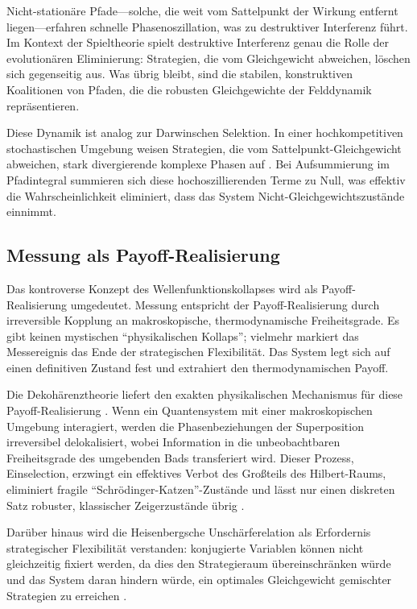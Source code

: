 \documentclass[12pt,a4paper]{article}
\theoremstyle{remark}
\begin{document}
Nicht-station\"are Pfade---solche, die weit vom Sattelpunkt der Wirkung entfernt liegen---erfahren schnelle Phasenoszillation, was zu destruktiver Interferenz f\"uhrt. Im Kontext der Spieltheorie spielt destruktive Interferenz genau die Rolle der evolution\"aren Eliminierung: Strategien, die vom Gleichgewicht abweichen, l\"oschen sich gegenseitig aus. Was \"ubrig bleibt, sind die stabilen, konstruktiven Koalitionen von Pfaden, die die robusten Gleichgewichte der Felddynamik repr\"asentieren.

Diese Dynamik ist analog zur Darwinschen Selektion. In einer hochkompetitiven stochastischen Umgebung weisen Strategien, die vom Sattelpunkt-Gleichgewicht abweichen, stark divergierende komplexe Phasen auf \citep{QuantumStrategies2024}. Bei Aufsummierung im Pfadintegral summieren sich diese hochoszillierenden Terme zu Null, was effektiv die Wahrscheinlichkeit eliminiert, dass das System Nicht-Gleichgewichtszust\"ande einnimmt.

\subsection{Messung als Payoff-Realisierung}

Das kontroverse Konzept des Wellenfunktionskollapses wird als Payoff-Realisierung umgedeutet. Messung entspricht der Payoff-Realisierung durch irreversible Kopplung an makroskopische, thermodynamische Freiheitsgrade. Es gibt keinen mystischen ``physikalischen Kollaps''; vielmehr markiert das Messereignis das Ende der strategischen Flexibilit\"at. Das System legt sich auf einen definitiven Zustand fest und extrahiert den thermodynamischen Payoff.

Die Dekoh\"arenztheorie liefert den exakten physikalischen Mechanismus f\"ur diese Payoff-Realisierung \citep{MeasurementClassical}. Wenn ein Quantensystem mit einer makroskopischen Umgebung interagiert, werden die Phasenbeziehungen der Superposition irreversibel delokalisiert, wobei Information in die unbeobachtbaren Freiheitsgrade des umgebenden Bads transferiert wird. Dieser Prozess, Einselection, erzwingt ein effektives Verbot des Gro\ss{}teils des Hilbert-Raums, eliminiert fragile ``Schr\"odinger-Katzen''-Zust\"ande und l\"asst nur einen diskreten Satz robuster, klassischer Zeigerzust\"ande \"ubrig \citep{Zurek2003}.

Dar\"uber hinaus wird die Heisenbergsche Unsch\"arferelation als Erfordernis strategischer Flexibilit\"at verstanden: konjugierte Variablen k\"onnen nicht gleichzeitig fixiert werden, da dies den Strategieraum \"ubereinschr\"anken w\"urde und das System daran hindern w\"urde, ein optimales Gleichgewicht gemischter Strategien zu erreichen \citep{HeisenbergCovariant}.
\end{document}
